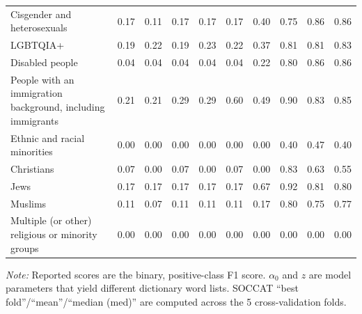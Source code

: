 \begin{table}[htb]
\begin{threeparttable}
\begin{tabular}{l c c c c c c c c c}
\shortstack[l]{Cisgender and\\[-3pt]heterosexuals} & 0.17 & 0.11 & 0.17 & 0.17 & 0.17 & 0.40 & 0.75 & 0.86 & 0.86 \\
LGBTQIA+ & 0.19 & 0.22 & 0.19 & 0.23 & 0.22 & 0.37 & 0.81 & 0.81 & 0.83 \\
Disabled people & 0.04 & 0.04 & 0.04 & 0.04 & 0.04 & 0.22 & 0.80 & 0.86 & 0.86 \\
\shortstack[l]{People with an immigration\\[-3pt]background, including immigrants} & 0.21 & 0.21 & 0.29 & 0.29 & 0.60 & 0.49 & 0.90 & 0.83 & 0.85 \\
\shortstack[l]{Ethnic and racial\\[-3pt]minorities} & 0.00 & 0.00 & 0.00 & 0.00 & 0.00 & 0.00 & 0.40 & 0.47 & 0.40 \\
Christians & 0.07 & 0.00 & 0.07 & 0.00 & 0.07 & 0.00 & 0.83 & 0.63 & 0.55 \\
Jews & 0.17 & 0.17 & 0.17 & 0.17 & 0.17 & 0.67 & 0.92 & 0.81 & 0.80 \\
Muslims & 0.11 & 0.07 & 0.11 & 0.11 & 0.11 & 0.17 & 0.80 & 0.75 & 0.77 \\
\shortstack[l]{Multiple (or other)\\[-3pt]religious or minority groups} & 0.00 & 0.00 & 0.00 & 0.00 & 0.00 & 0.00 & 0.00 & 0.00 & 0.00 \\
\bottomrule
\end{tabular}
\begin{tablenotes}[flushleft]
\footnotesize
\item \textit{Note:} Reported scores are the binary, positive-class F1 score. $\alpha_0$ and $z$ are model parameters that yield different dictionary word lists. SOCCAT ``best fold''/``mean''/``median (med)'' are computed across the 5 cross-validation folds.
\end{tablenotes}
\end{threeparttable}
\end{table}